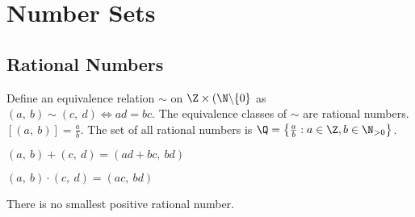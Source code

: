 \documentclass{article}
\begin{document}
\section{Number Sets}
\subsection{Rational Numbers}
\begin{definition}
    Define an equivalence relation $\sim$ on $\Z \times (\N\backslash\{0\}$
    as $(a,\: b) \sim (c,\: d) \iff ad=bc$.
    The equivalence classes of $\sim$ are rational numbers.
    $[(a,\: b)] = \frac{a}{b}$.
    The set of all rational numbers is
    $\Q = \left\{ \frac{a}{b} : a\in \Z, b\in \N_{>0} \right\}$.
\end{definition}
%
\begin{definition}
    $(a,\: b) + (c,\: d) = (ad+bc,\: bd)$
\end{definition}
%
\begin{definition}
    $(a,\: b) \cdot (c,\: d) = (ac,\: bd)$
\end{definition}
\begin{theorem}
    There is no smallest positive rational number.
\end{theorem}
%
\end{document}

